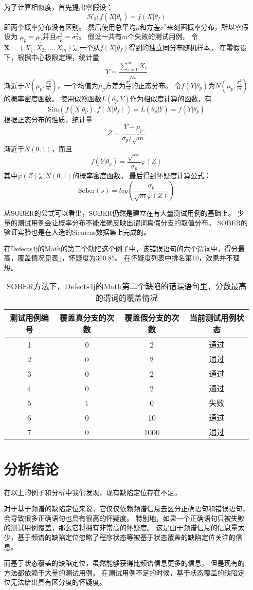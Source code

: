 为了计算相似度，首先提出零假设：
$$\mathcal{H}_0 : f(X|\theta_p) = f(X|\theta_f)$$
即两个概率分布没有区别。
然后使用总平均$\mu$和方差$\sigma^2$来刻画概率分布，所以零假设为
$\mu_p = \mu_f$并且$\sigma_p^2 = \sigma_f^2$。
假设一共有$m$个失败的测试用例，
令$\textbf{X} = (X_1, X_2, ..., X_m)$是一个从$f(X|\theta_f)$得到的独立同分布随机样本。
在零假设下，根据中心极限定理，统计量
$$
Y = \frac{\sum_{i = 1}^m X_i}{m}
$$
渐近于$N(\mu_p, \frac{\sigma_p^2}{m})$，一个均值为$\mu_p$方差为$\frac{\sigma_p^2}{m}$的正态分布。
令$f(Y|\theta_p)$为$N(\mu_p, \frac{\sigma_p^2}{m})$的概率密度函数。
使用似然函数$L(\theta_p | Y)$作为相似度计算的函数，有
$$
\mathrm{Sim}(f(X|\theta_p), f(X|\theta_f)) = L(\theta_p | Y) = f(Y|\theta_p)
$$
根据正态分布的性质，统计量
$$
Z = \frac{Y - \mu_p}{\sigma_p / \sqrt{m}}
$$
渐近于$N(0,1)$，而且
$$
f(Y|\theta_p) = \frac{\sqrt{m}}{\sigma_p}\varphi(Z)
$$
其中$\varphi(Z)$是$N(0,1)$的概率密度函数。
最后得到怀疑度计算公式：
\begin{equation}
\mathrm{Sober}(s) = log\left( \frac{\sigma_p}{\sqrt{m}\varphi(Z)} \right)\label{eq:sober}
\end{equation}

从SOBER的公式可以看出，SOBER仍然是建立在有大量测试用例的基础上。
少量的测试用例会让概率分布不能准确反映出谓词真假分支的取值分布。
SOBER的验证实验也是在人造的Siemens数据集上完成的。

在Defects4j的Math的第二个缺陷这个例子中，该错误语句的六个谓词中，得分最高，覆盖情况见表\ref{math_2_sober}，怀疑度为360.85。
在怀疑度列表中排名第10，效果并不理想。

\begin{table}
\centering
\begin{tabular}{|c|c|c|c|}
\hline
测试用例编号 & 覆盖真分支的次数 & 覆盖假分支的次数 & 当前测试用例状态 \\
\hline
1 & 0 & 2 & 通过 \\
\hline
2 & 0 & 2 & 通过 \\
\hline
3 & 0 & 2 & 通过 \\
\hline
4 & 0 & 2 & 通过 \\
\hline
5 & 1 & 0 & 失败 \\
\hline
6 & 0 & 10 & 通过 \\
\hline
7 & 0 & 1000 & 通过 \\
\hline
\end{tabular}
\caption{SOBER方法下，Defects4j的Math第二个缺陷的错误语句里，分数最高的谓词的覆盖情况}
\label{math_2_sober}
\end{table}

\section{分析结论}

在以上的例子和分析中我们发现，现有缺陷定位存在不足。

对于基于频谱的缺陷定位来说，它仅仅依赖频谱信息去区分正确语句和错误语句，
会导致很多正确语句也具有很高的怀疑度。
特别地，如果一个正确语句只被失败的测试用例覆盖，那么它将拥有非常高的怀疑度。
这是由于频谱信息的信息量太少，基于频谱的缺陷定位忽略了程序状态等被基于状态覆盖的缺陷定位关注的信息。

而基于状态覆盖的缺陷定位，虽然能够获得比频谱信息更多的信息，
但是现有的方法都依赖于大量的测试用例。
在测试用例不足的时候，基于状态覆盖的缺陷定位无法给出具有区分度的怀疑度。
